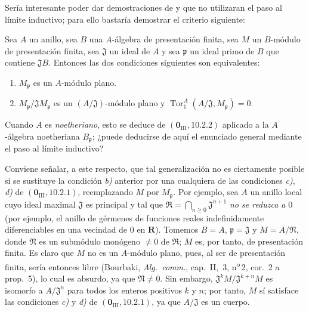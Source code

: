 \begin{remark}[11.3.12]
\label{IV.11.3.12}
Sería interesante poder dar demostraciones de  y  que no utilizaran el paso al límite inductivo; para ello bastaría demostrar el criterio siguiente:

Sea $A$ un anillo, sea $B$ una $A$-álgebra de presentación finita, sea $M$ un $B$-módulo de presentación finita, sea $\mathfrak J$ un  ideal de $A$ y sea $\mathfrak p$ un ideal primo de $B$ que contiene $\mathfrak JB$. Entonces las dos condiciones siguientes son equivalentes:
\begin{enumerate}[label=\emph{\alph*)}]
  \item $M_\mathfrak p$ es un $A$-módulo plano.
  \item $M_\mathfrak p/\mathfrak JM_\mathfrak p$ es un $(A/\mathfrak J)$-módulo plano y $\operatorname{Tor}_1^A(A/\mathfrak J,M_\mathfrak p)=0$.
\end{enumerate}
Cuando $A$ es \emph{noetheriano}, esto se deduce de $(\mathbf 0_{\mathrm{III}},10.2.2)$ aplicado a la $A$-álgebra noetheriana $B_\mathfrak p$; ¿puede deducirse de aquí el enunciado general mediante el paso al límite inductivo?

Conviene señalar, a este respecto, que tal generalización no es ciertamente posible si se sustituye la condición \emph{b)} anterior por una cualquiera de las condiciones \emph{c)}, \emph{d)} de $(\mathbf 0_{\mathrm{III}},10.2.1)$, reemplazando $M$ por $M_\mathfrak p$. Por ejemplo, sea $A$ un anillo local cuyo ideal maximal $\mathfrak J$ es principal y tal que
$\mathfrak R=\bigcap_{n\geq0}\mathfrak J^{n+1}$
\emph{no se reduzca a} $0$ (por ejemplo, el anillo de gérmenes de funciones reales indefinidamente diferenciables en una vecindad de $0$ en $\mathbf R$). Tomemos $B=A$, $\mathfrak p=\mathfrak J$ y $M=A/\mathfrak N$, donde $\mathfrak N$ es un submódulo monógeno $\neq0$ de $\mathfrak R$; $M$ es, por tanto, de presentación finita. Es claro que $M$ no es un $A$-módulo plano, pues, al ser de presentación finita, sería entonces libre (Bourbaki, \emph{Alg.\ comm.}, cap.~II, \textsection\,3, n\textsuperscript{o}\,2, cor.~2 a prop.~5), lo cual es absurdo, ya que $\mathfrak N\neq0$. Sin embargo,
$\mathfrak J^kM/\mathfrak J^{k+n}M$ es isomorfo a $A/\mathfrak J^n$
para todos los enteros positivos $k$ y $n$; por tanto, $M$ sí satisface las condiciones \emph{c)} y \emph{d)} de $(\mathbf 0_{\mathrm{III}},10.2.1)$, ya que $A/\mathfrak J$ es un cuerpo.
\end{remark}

